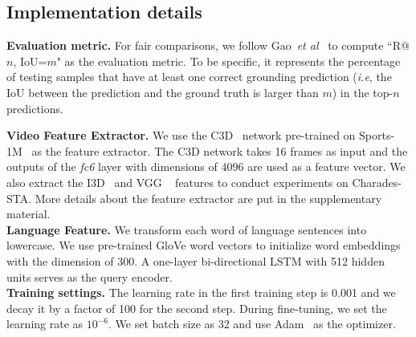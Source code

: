\documentclass[10pt,twocolumn,letterpaper]{article}
\def\ie{\emph{i.e}\onedot} \def\Ie{\emph{I.e}\onedot}
\def\etal{\emph{et al}\onedot}
\begin{document}
	\subsection{Implementation details}
	\label{sec:Implementation}
	
	\noindent \textbf{Evaluation metric.} 
For fair comparisons, we follow Gao~\etal~\cite{gao2017tall} to compute ``R@$n$, IoU=$m$" as the evaluation metric. To be specific, it represents
    the percentage of testing samples that have at least one correct grounding prediction (\ie, the IoU between the prediction and the ground truth is larger than $m$) in the top-$n$ predictions.
	
	\noindent \textbf{Video Feature Extractor.} We use the C3D~\cite{tran2015learning} network pre-trained on Sports-1M~\cite{karpathy2014large} as the feature extractor. The C3D network takes 16 frames as input and the outputs of the \textit{fc6} layer with dimensions of 4096 are used as a feature vector. We also extract the I3D~\cite{carreira2017quo} and VGG ~\cite{simonyan2014very} features to conduct experiments on Charades-STA. More details about the feature extractor are put in the supplementary material.  \\
	\noindent \textbf{Language Feature.}
	We transform each word of language sentences into lowercase. We use pre-trained GloVe word vectors to initialize word embeddings with the dimension of 300. A one-layer bi-directional LSTM with 512 hidden units serves as the query encoder. \\
\noindent \textbf{Training settings.}
	The learning rate in the first training step is 0.001 and we decay it by a factor of 100 for the second step. During fine-tuning, we set the learning rate as $10^{-6}$. We set batch size as 32 and use Adam~\cite{kingma2014adam} as the optimizer.
	
\end{document}
